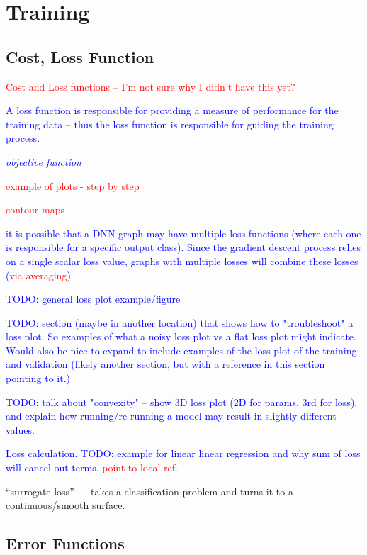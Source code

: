 \section{Training}

\subsection{Cost, Loss Function}

\textcolor{red}{Cost and Loss functions -- I'm not sure why I didn't have this yet?}

\textcolor{blue}{A loss function is responsible for providing a measure of performance for the training data -- thus the loss function is responsible for guiding the training process.}

\textcolor{blue}{\textit{objective function}}

\textcolor{red}{example of plots - step by step}

\textcolor{red}{contour maps}

\textcolor{blue}{it is possible that a DNN graph may have multiple loss functions (where each one is responsible for a specific output class). Since the gradient descent process relies on a single scalar loss value, graphs with multiple losses will combine these losses (\textcolor{red}{via averaging})}

\textcolor{blue}{TODO: general loss plot example/figure}

\textcolor{blue}{TODO: section (maybe in another location) that shows how to "troubleshoot" a loss plot. So examples of what a noisy loss plot vs a flat loss plot might indicate. Would also be nice to expand to include examples of the loss plot of the training and validation (likely another section, but with a reference in this section pointing to it.)}

\textcolor{blue}{TODO: talk about "convexity" -- show 3D loss plot (2D for params, 3rd for loss), and explain how running/re-running a model may result in slightly different values.}

\textcolor{blue}{Loss calculation. TODO: example for linear linear regression and why sum of loss will cancel out terms. \textcolor{red}{point to local ref.}}

\r{``surrogate loss'' --- takes a classification problem and turns it to a continuous/smooth surface.}

\subsection{Error Functions}

